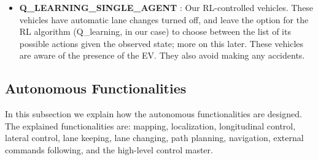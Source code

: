 \begin{itemize}
\begin{enumerate}
\begin{itemize}
        \item \textbf{Q\_LEARNING\_SINGLE\_AGENT} : Our RL-controlled vehicles. These vehicles have automatic lane changes turned off, and leave the option for the RL algorithm (Q\_learning, in our case) to choose between the list of its possible actions given the observed state; more on this later. These vehicles are aware of the presence of the EV. They also avoid making any accidents.
        
    \end{itemize}
    \label{RL_pt}
    
\end{enumerate}
\end{itemize}

\subsection{Autonomous Functionalities}
\label{specs_auto_func}
In this subsection we explain how the autonomous functionalities are designed. The explained functionalities are: mapping, localization, longitudinal control, lateral control, lane keeping, lane changing, path planning, navigation, external commands following, and the high-level control master. 

